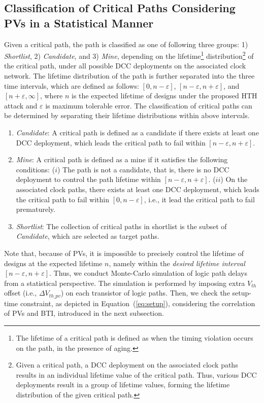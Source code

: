 \subsection{Classification of Critical Paths Considering PVs in a Statistical Manner}
\label{sec:frame:cp}
Given a critical path, the path is classified as one of following three groups: 1) \textit{Shortlist}, 2) \textit{Candidate}, and 3) \textit{Mine}, depending on the lifetime\footnote{The lifetime of a critical path is defined as when the timing violation occurs on the path, in the presence of aging.} distribution\footnote{Given a critical path, a DCC deployment on the associated clock paths results in an individual lifetime value of the critical path. Thus, various DCC deployments result in a group of lifetime values, forming the lifetime distribution of the given critical path.} of the critical path, under all possible DCC deployments on the associated clock network. The lifetime distribution of the path is further separated into the three time intervals, which are defined as follows: $[0, n - \varepsilon]$, $[n - \varepsilon, n + \varepsilon]$, and $[n + \varepsilon, \infty]$, where $n$ is the expected lifetime of designs under the proposed HTH attack and $\varepsilon$ is maximum tolerable error. The classification of critical paths can be determined by separating their lifetime distributions within above intervals. 
\begin{enumerate}[leftmargin=*]
	\item \textit{Candidate}: A critical path is defined as a candidate if there exists at least one DCC deployment, which leads the critical path to fail within $[n - \varepsilon, n + \varepsilon]$.
	\item \textit{Mine}: A critical path is defined as a mine if it satisfies the following conditions: ($i$) The path is not a candidate, that is, there is no DCC deployment to control the path lifetime within $[n - \varepsilon, n + \varepsilon]$. ($ii$) On the associated clock paths, there exists at least one DCC deployment, which leads the critical path to fail within $[0, n - \varepsilon]$, i.e., it lead the critical path to fail prematurely.
	\item \textit{Shortlist}:  The collection of critical paths in shortlist is the subset of \textit{Candidate}, which are selected as target paths.
\end{enumerate}

Note that, because of PVs, it is impossible to precisely control the lifetime of designs at the expected lifetime $n$, namely within the \textit{desired lifetime interval}  $[n - \varepsilon, n + \varepsilon]$. Thus, we conduct Monte-Carlo simulation of logic path delays from a statistical perspective. The simulation is performed by imposing extra $V_{th}$ offset (i.e., $\Delta V_{th\_pv}$) on each transistor of logic paths. Then, we check the setup-time constraint, as depicted in Equation~(\ref{eq:setup}), considering the correlation of PVs and BTI, introduced in the next subsection. 


